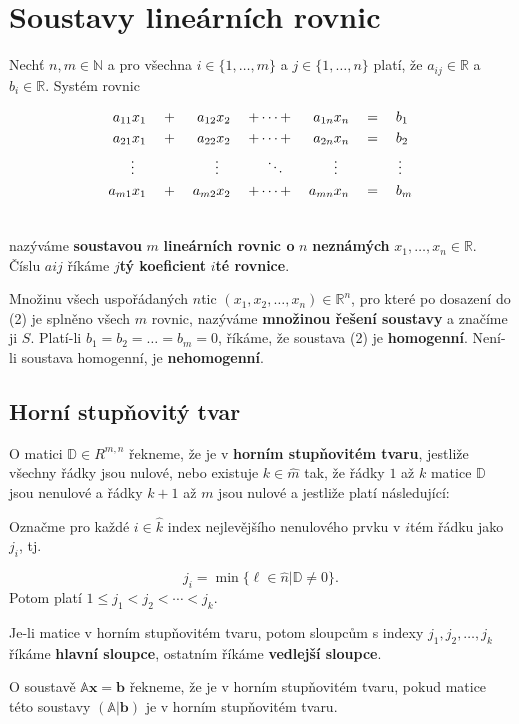 \documentclass{szzclass}
\newcommand{\mathbbm}[1]{\boldsymbol#1}
\begin{document}
\section{Soustavy lineárních rovnic}
\begin{definition}
Nechť $n,m\in\mathbb{N}$ a pro všechna $i\in\{1,\dots, m\}$ a
$j\in\{1, \dots, n\}$ platí, že $a_{ij} \in\mathbb{R}$ a $b_i \in\mathbb{R}$. Systém rovnic

\begin{alignat}{7}
a_{11} x_1 &&\; + \;&& a_{12} x_2 &&\; + \cdots + \;&& a_{1n} x_n &&\; = \;&&& b_1 \\ \notag
a_{21} x_1 &&\; + \;&& a_{22} x_2 &&\; + \cdots + \;&& a_{2n} x_n &&\; = \;&&& b_2 \\ \notag
\vdots\;\;\; &&     && \vdots\;\;\; &&  \ddots\;\;\;&& \vdots\;\;\; &&     &&& \,\vdots \\ \notag
a_{m1} x_1 &&\; + \;&& a_{m2} x_2 &&\; + \cdots + \;&& a_{mn} x_n &&\; = \;&&& b_m \\ \notag
\end{alignat}

nazýváme \textbf{soustavou} $m$ \textbf{lineárních rovnic o} $n$ \textbf{neznámých} $x_1,\dots, x_n \in\mathbb{R}$.\\
Číslu $aij$ říkáme $j$\textbf{tý koeficient} $i$\textbf{té rovnice}.

Množinu všech uspořádaných $n$tic $(x_1, x_2,\dots, x_n) \in\mathbb{R}^n$, pro které po dosazení do (2) je splněno všech $m$ rovnic, nazýváme \textbf{množinou řešení soustavy} a značíme ji $S$.
Platí-li $b_1 = b_2 = \dots = b_m = 0$, říkáme, že soustava (2) je \textbf{homogenní}.
Není-li soustava homogenní, je \textbf{nehomogenní}.
\end{definition}

\subsection{Horní stupňovitý tvar}
\begin{definition}
O matici $\mathbb{D}\in R^{m,n}$ řekneme, že je v \textbf{horním stupňovitém tvaru}, jestliže všechny řádky jsou nulové, nebo existuje $k\in\hat{m}$ tak, že řádky $1$ až $k$ matice $\mathbb{D}$ jsou nenulové a řádky $k + 1$ až $m$ jsou nulové a jestliže platí následující:

Označme pro každé $i\in\hat{k}$ index nejlevějšího nenulového prvku v $i$tém řádku jako
$j_i$, tj.

$$
j_i=\min{\{\ell\in\hat{n}|\mathbb{D}\neq 0\}}.
$$
Potom platí $1 \leq j_1 < j_2 < \cdots < j_k$.

Je-li matice v horním stupňovitém tvaru, potom sloupcům s indexy $j_1, j_2, \dots , j_k$
říkáme \textbf{hlavní sloupce}, ostatním říkáme \textbf{vedlejší sloupce}.

O soustavě $\mathbb{A}\mathbbm{x} = \mathbbm{b}$ řekneme, že je v horním stupňovitém tvaru, pokud matice této soustavy $(\mathbb{A}|\mathbbm{b})$ je v horním stupňovitém tvaru.
\end{definition}
\end{document}

